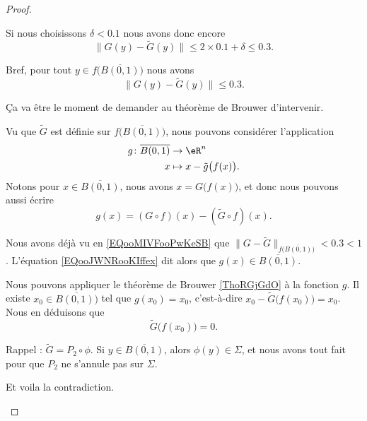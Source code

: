 \begin{proof}
\begin{subproof}
		Si nous choisissons \( \delta<0.1\) nous avons donc encore
		\begin{equation}
			\| G(y)-\tilde G(y) \|\leq 2\times 0.1+\delta\leq 0.3.
		\end{equation}
	\end{subproof}
	Bref, pour tout \( y\in f\big( \overline{B(0,1)} \big)\) nous avons
	\begin{equation}		\label{EQooMIVFooPwKeSB}
		\| G(y)-\tilde  G(y) \|\leq 0.3.
	\end{equation}

	Ça va être le moment de demander au théorème de Brouwer d'intervenir.

	\begin{subproof}
		\spitem[Définition de \( g\)]

		Vu que \( \tilde G\) est définie sur \( f\big( \overline{B(0,1)} \big)\), nous pouvons considérer l'application
		\begin{equation}
			\begin{aligned}
				g\colon \overline{B(0,1)} & \to \eR^n                           \\
				x                         & \mapsto x-\tilde g\big( f(x) \big).
			\end{aligned}
		\end{equation}
		Notons pour \( x\in \overline{B(0,1)}\), nous avons \( x=G\big( f(x) \big)\), et donc nous pouvons aussi écrire
		\begin{equation}		\label{EQooJWNRooKIffex}
			g(x)=(G\circ f)(x)-(\tilde  G\circ f)(x).
		\end{equation}
		\spitem[\( g(x)\in \overline{B(0,1)}\) ]

		Nous avons déjà vu en \eqref{EQooMIVFooPwKeSB} que \( \| G-\tilde G \|_{f\big( \overline{B(0,1)} \big)}< 0.3<1\). L'équation \eqref{EQooJWNRooKIffex} dit alors que \( g(x)\in \overline{B(0,1)}\).

		\spitem[Brouwer]
		Nous pouvons appliquer le théorème de Brouwer \eqref{ThoRGjGdO} à la fonction \( g\). Il existe \( x_0\in \overline{B(0,1))}\) tel que \( g(x_0)=x_0\), c'est-à-dire \( x_0-\tilde G\big( f(x_0) \big)=x_0\). Nous en déduisons que
		\begin{equation}
			\tilde G\big( f(x_0) \big)=0.
		\end{equation}

		\spitem[La contradiction]
		Rappel : \( \tilde G=P_2\circ \phi\). Si \( y\in \overline{B(0,1)}\), alors \( \phi(y)\in \Sigma\), et nous avons tout fait pour que \( P_2\) ne s'annule pas sur \( \Sigma\).

		Et voila la contradiction.

	\end{subproof}
\end{proof}

